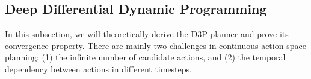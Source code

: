 \documentclass{article} %
\begin{document}
    



\subsection{Deep Differential Dynamic Programming}
In this subsection, we will theoretically derive the D3P planner and prove its convergence property.
There are mainly two challenges in  continuous action space planning: (1) the infinite number of  candidate actions, and (2) the temporal dependency between actions in different timesteps.  
\end{document}
